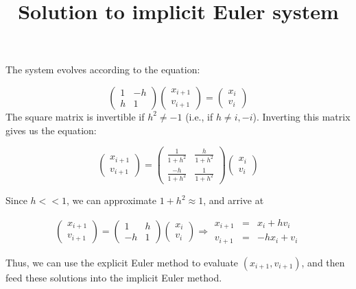 \documentclass[11pt, oneside]{article}   	%
\begin{document}
\begin{section}
\title{\textbf{Solution to implicit Euler system}}
\maketitle 

The system evolves according to the equation: 

$$
\begin{pmatrix}
1 & -h \\
h & 1
\end{pmatrix}
\begin{pmatrix}
x_{i+1} \\
v_{i+1}
\end{pmatrix}
=
\begin{pmatrix}
x_{i} \\
v_{i}
\end{pmatrix}
$$
The square matrix is invertible if $h^2 \not=-1$ (i.e., if $h \not= i, -i$). Inverting this matrix gives us the equation:

$$
\begin{pmatrix}
x_{i+1} \\
v_{i+1}
\end{pmatrix}
=
\begin{pmatrix}
\frac{1}{1 + h^2} & \frac{h}{1 + h^2} \\
\frac{-h}{1 + h^2} & \frac{1}{1 + h^2}
\end{pmatrix}
\begin{pmatrix}
x_{i} \\
v_{i}
\end{pmatrix}
$$

Since $h << 1$, we can approximate $1 + h^2 \approx 1$, and arrive at 

$$
\begin{pmatrix}
x_{i+1} \\
v_{i+1}
\end{pmatrix}
=
\begin{pmatrix}
1 & h\\
-h & 1
\end{pmatrix}
\begin{pmatrix}
x_{i} \\
v_{i}
\end{pmatrix}
\Rightarrow
\begin{array}
{lcl} x_{i+1} & = & x_{i}  +  hv_{i}\\ 
v_{i+1} & = & -hx_{i}  + v_{i} 
\end{array}
$$

Thus, we can use the explicit Euler method to evaluate $(x_{i+1}, v_{i+1})$, and then feed these solutions into the implicit Euler method.


\end{section}
\end{document}
